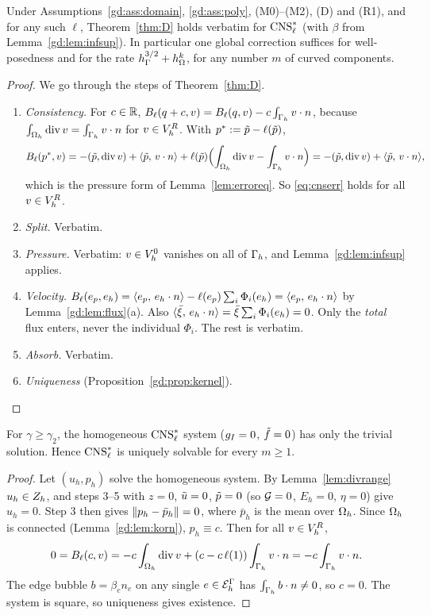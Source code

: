 \begin{theorem}\label{gd:thm:D}
Under Assumptions~\ref{gd:ass:domain}, \ref{gd:ass:poly}, (M0)--(M2), (D) and (R1), and for any such $\ell$, Theorem~\ref{thm:D} holds verbatim for $\mathrm{CNS}^\ast_\ell$ (with $\beta$ from Lemma~\ref{gd:lem:infsup}). In particular one global correction suffices for well-posedness and for the rate $h_\Gamma^{3/2}+h_\Omega^k$, for any number $m$ of curved components.
\end{theorem}

\begin{proof}
We go through the steps of Theorem~\ref{thm:D}.
\begin{enumerate}
\item \emph{Consistency.} For $c\in\mathbb R$, $B_\ell(q+c,v)=B_\ell(q,v)-c\int_{\Gamma_h}v\cdot n$, because $\int_{\Omega_h}\operatorname{div} v=\int_{\Gamma_h}v\cdot n$ for $v\in V_h^R$. With $p^\ast:=\tilde p-\ell(\tilde p)$,
\[
B_\ell(p^\ast,v)=-(\tilde p,\operatorname{div} v)+\langle \tilde p,\, v\cdot n\rangle+\ell(\tilde p)\Bigl(\int_{\Omega_h}\operatorname{div} v-\int_{\Gamma_h}v\cdot n\Bigr)=-(\tilde p,\operatorname{div} v)+\langle \tilde p,\, v\cdot n\rangle,
\]
which is the pressure form of Lemma~\ref{lem:erroreq}. So \eqref{eq:cnserr} holds for all $v\in V_h^R$.
\item \emph{Split.} Verbatim.
\item \emph{Pressure.} Verbatim: $v\in V_h^0$ vanishes on all of $\Gamma_h$, and Lemma~\ref{gd:lem:infsup} applies.
\item \emph{Velocity.} $B_\ell(e_p,e_h)=\langle e_p,\, e_h\cdot n\rangle-\ell(e_p)\sum_i\Phi_i(e_h)=\langle e_p,\, e_h\cdot n\rangle$ by Lemma~\ref{gd:lem:flux}(a). Also $\langle \bar\xi,\, e_h\cdot n\rangle=\bar\xi\sum_i\Phi_i(e_h)=0$. Only the \emph{total} flux enters, never the individual $\Phi_i$. The rest is verbatim.
\item \emph{Absorb.} Verbatim.
\item \emph{Uniqueness} (Proposition~\ref{gd:prop:kernel}).\qedhere
\end{enumerate}
\end{proof}

\begin{proposition}\label{gd:prop:kernel}
For $\gamma\ge\gamma_2$, the homogeneous $\mathrm{CNS}^\ast_\ell$ system ($g_I=0$, $\tilde f=0$) has only the trivial solution. Hence $\mathrm{CNS}^\ast_\ell$ is uniquely solvable for every $m\ge1$.
\end{proposition}

\begin{proof}
Let $(u_h,p_h)$ solve the homogeneous system. By Lemma~\ref{lem:divrange} $u_h\in Z_h$, and steps 3--5 with $z=0$, $\tilde u=0$, $\tilde p=0$ (so $\mathcal G=0$, $E_h=0$, $\eta=0$) give $u_h=0$. Step 3 then gives $\lVert p_h-\bar p_h\rVert=0$, where $\bar p_h$ is the mean over $\Omega_h$. Since $\Omega_h$ is connected (Lemma~\ref{gd:lem:korn}), $p_h\equiv c$. Then for all $v\in V_h^R$,
\[
0=B_\ell(c,v)=-c\int_{\Omega_h}\operatorname{div} v+(c-c\,\ell(1))\int_{\Gamma_h}v\cdot n=-c\int_{\Gamma_h}v\cdot n .
\]
The edge bubble $b=\beta_en_e$ on any single $e\in\mathcal E_h^\Gamma$ has $\int_{\Gamma_h}b\cdot n\ne0$, so $c=0$. The system is square, so uniqueness gives existence.
\end{proof}

